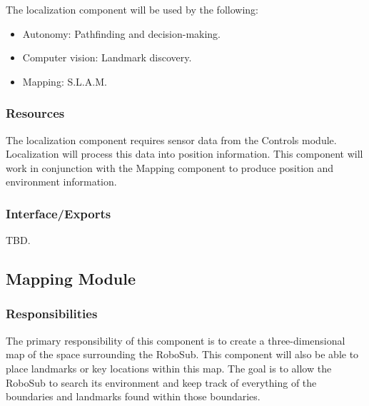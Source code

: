 The localization component will be used by the following: 
\begin{itemize}
    \item Autonomy: Pathfinding and decision-making. 
    \item Computer vision: Landmark discovery. 
    \item Mapping: S.L.A.M.
\end{itemize}

\subsubsection{Resources}
\label{sec:resources}

The localization component requires sensor data from the Controls module.
Localization will process this data into position information. This component
will work in conjunction with the Mapping component to produce position and
environment information.
\par

\subsubsection{Interface/Exports}
\label{sec:exports}

TBD.

\subsection{Mapping Module}
\label{sec:mapping_design}

\subsubsection{Responsibilities}
\label{sec:responsibilities}

The primary responsibility of this component is to create a three-dimensional
map of the space surrounding the RoboSub. This component will also be able to
place landmarks or key locations within this map. The goal is to allow the
RoboSub to search its environment and keep track of everything of the
boundaries and landmarks found within those boundaries.
\par

